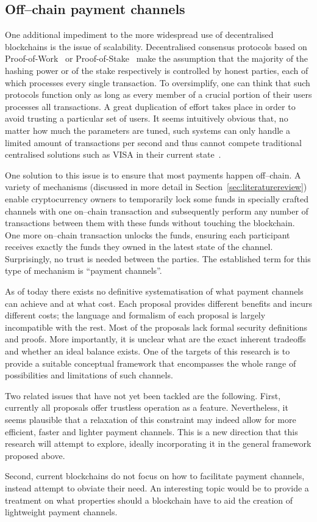\subsection{Off--chain payment channels}
  One additional impediment to the more widespread use of decentralised blockchains is the
  issue of scalability. Decentralised consensus protocols based on
  Proof-of-Work~\cite{hashcash} or Proof-of-Stake~\cite{ouroboros} make the assumption
  that the majority of the hashing power or of the stake respectively is controlled by
  honest parties, each of which processes every single transaction. To oversimplify, one
  can think that such protocols function only as long as every member of a crucial portion
  of their users processes all transactions. A great duplication of effort takes place in
  order to avoid trusting a particular set of users. It seems intuitively obvious that, no
  matter how much the parameters are tuned, such systems can only handle a limited amount
  of transactions per second and thus cannot compete traditional centralised solutions
  such as VISA in their current state~\cite{tps}.

  One solution to this issue is to ensure that most payments happen off--chain. A variety
  of mechanisms (discussed in more detail in Section~\ref{sec:literaturereview}) enable
  cryptocurrency owners to temporarily lock some funds in specially crafted channels with
  one on--chain transaction and subsequently perform any number of transactions between
  them with these funds without touching the blockchain. One more on--chain transaction
  unlocks the funds, ensuring each participant receives exactly the funds they owned in
  the latest state of the channel. Surprisingly, no trust is needed between the parties.
  The established term for this type of mechanism is ``payment channels''.

  As of today there exists no definitive systematisation of what payment channels can
  achieve and at what cost. Each proposal provides different benefits and incurs different
  costs; the language and formalism of each proposal is largely incompatible with the
  rest. Most of the proposals lack formal security definitions and proofs. More
  importantly, it is unclear what are the exact inherent tradeoffs and whether an ideal
  balance exists. One of the targets of this research is to provide a suitable conceptual
  framework that encompasses the whole range of possibilities and limitations of such
  channels.

  Two related issues that have not yet been tackled are the following. First, currently
  all proposals offer trustless operation as a feature. Nevertheless, it seems plausible
  that a relaxation of this constraint may indeed allow for more efficient, faster and
  lighter payment channels. This is a new direction that this research will attempt to
  explore, ideally incorporating it in the general framework proposed above.

  Second, current blockchains do not focus on how to facilitate payment channels, instead
  attempt to obviate their need. An interesting topic would be to provide a treatment on
  what properties should a blockchain have to aid the creation of lightweight payment
  channels.
